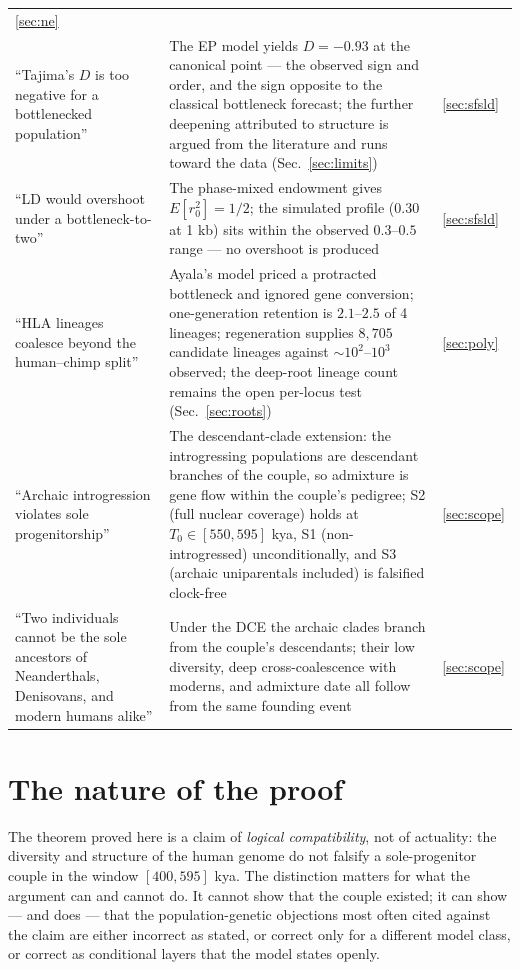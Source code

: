 \begin{table}[t]
\begin{tabular}{p{4.6cm}p{6.4cm}p{4.2cm}}
\ref{sec:ne} \\
``Tajima's $D$ is too negative for a
bottlenecked population'' &
The EP model yields $D = -0.93$ at the canonical point --- the observed
sign and order, and the sign opposite to the classical bottleneck
forecast; the further deepening attributed to structure is argued from
the literature and runs toward the data (Sec.~\ref{sec:limits}) &
\ref{sec:sfsld} \\
``LD would overshoot under a
bottleneck-to-two'' &
The phase-mixed endowment gives $E[r^2_0] = 1/2$; the simulated
profile ($0.30$ at 1 kb) sits within the observed $0.3$--$0.5$ range ---
no overshoot is produced &
\ref{sec:sfsld} \\
``HLA lineages coalesce beyond the
human--chimp split'' &
Ayala's model priced a protracted bottleneck and ignored gene
conversion; one-generation retention is $2.1$--$2.5$ of 4 lineages;
regeneration supplies $8{,}705$ candidate lineages against
$\sim$$10^2$--$10^3$ observed; the deep-root lineage count remains the
open per-locus test (Sec.~\ref{sec:roots}) &
\ref{sec:poly} \\
``Archaic introgression violates sole
progenitorship'' &
The descendant-clade extension: the introgressing populations are
descendant branches of the couple, so admixture is gene flow within the
couple's pedigree; S2 (full nuclear coverage) holds at $T_0 \in [550,
595]$ kya, S1 (non-introgressed) unconditionally, and S3 (archaic
uniparentals included) is falsified clock-free &
\ref{sec:scope} \\
``Two individuals cannot be the sole
ancestors of Neanderthals, Denisovans, and modern humans alike'' &
Under the DCE the archaic clades branch from the couple's descendants;
their low diversity, deep cross-coalescence with moderns, and admixture
date all follow from the same founding event &
\ref{sec:scope} \\
\bottomrule
\end{tabular}
\end{table}

\section{The nature of the proof}\label{sec:nature}
The theorem proved here is a claim of
\emph{logical compatibility}, not of actuality: the diversity and
structure of the human genome do not falsify a sole-progenitor couple in
the window $[400, 595]$ kya. The distinction matters for what the
argument can and cannot do. It cannot show that the couple existed; it
can show --- and does --- that the population-genetic objections most
often cited against the claim are either incorrect as stated, or correct
only for a different model class, or correct as conditional layers that
the model states openly.

